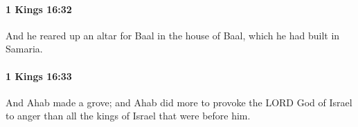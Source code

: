 		\paragraph{1 Kings 16:32} %
			\label{1KINGS-16-32}

			And he reared up an altar for Baal in the house of Baal, which he had built in Samaria.


		\paragraph{1 Kings 16:33} %
			\label{1KINGS-16-33}

			And Ahab made a grove; and Ahab did more to provoke the LORD God of Israel to anger than all the kings of Israel that were before him.


